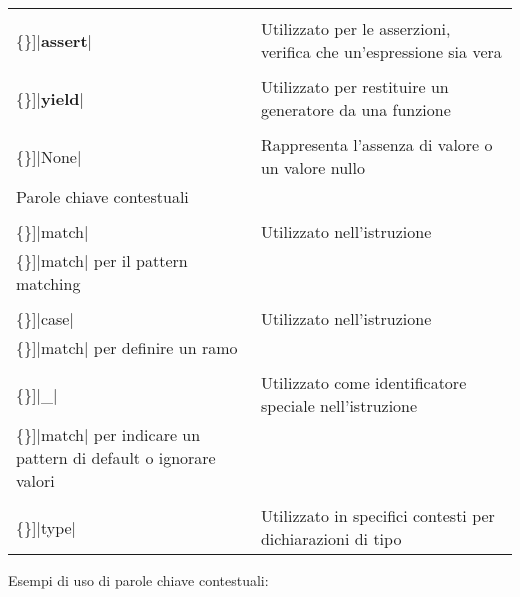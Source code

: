 \documentclass[
  letterpaper,
]{scrbook}
\newcommand{\VERB}{\Verb[commandchars=\\\{\}]}
\newcommand{\BuiltInTok}[1]{\textcolor[rgb]{0.00,0.23,0.31}{#1}}
\newcommand{\ControlFlowTok}[1]{\textcolor[rgb]{0.00,0.23,0.31}{\textbf{#1}}}
\newcommand{\NormalTok}[1]{\textcolor[rgb]{0.00,0.23,0.31}{#1}}
\newcommand{\VariableTok}[1]{\textcolor[rgb]{0.07,0.07,0.07}{#1}}
\begin{document}
\begin{longtable}[]{@{}
  >{\raggedright\arraybackslash}p{}
  >{\raggedright\arraybackslash}p{}@{}}
\VERB|\ControlFlowTok{assert}| & Utilizzato per le asserzioni, verifica
che un'espressione sia vera \\
\VERB|\ControlFlowTok{yield}| & Utilizzato per restituire un generatore
da una funzione \\
\VERB|\VariableTok{None}| & Rappresenta l'assenza di valore o un valore
nullo \\
Parole chiave contestuali & \\
\VERB|\NormalTok{match}| & Utilizzato nell'istruzione
\VERB|\NormalTok{match}| per il pattern matching \\
\VERB|\NormalTok{case}| & Utilizzato nell'istruzione
\VERB|\NormalTok{match}| per definire un ramo \\
\VERB|\NormalTok{\_}| & Utilizzato come identificatore speciale
nell'istruzione \VERB|\NormalTok{match}| per indicare un pattern di
default o ignorare valori \\
\VERB|\BuiltInTok{type}| & Utilizzato in specifici contesti per
dichiarazioni di tipo \\
\end{longtable}

Esempi di uso di parole chiave contestuali:
\end{document}
